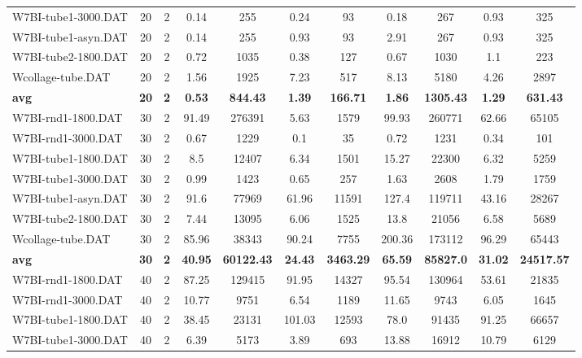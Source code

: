 \begin{table}[!ht]
\begin{tabular}{lcccccccccc}
W7BI-tube1-3000.DAT & 20 & 2 &  \textcolor{blue2}{0.14} & 255 & 0.24 & 93 & 0.18 & 267 & 0.93 & 325 \\
W7BI-tube1-asyn.DAT & 20 & 2 &  \textcolor{blue2}{0.14} & 255 & 0.93 & 93 & 2.91 & 267 & 0.93 & 325 \\
W7BI-tube2-1800.DAT & 20 & 2 & 0.72 & 1035 &  \textcolor{blue2}{0.38} & 127 & 0.67 & 1030 & 1.1 & 223 \\
Wcollage-tube.DAT & 20 & 2 &  \textcolor{blue2}{1.56} & 1925 & 7.23 & 517 & 8.13 & 5180 & 4.26 & 2897 \\
\cline{1-11} \textbf{avg} & \textbf{20} & \textbf{2} & \textbf{0.53} & \textbf{844.43} & \textbf{1.39} & \textbf{166.71} & \textbf{1.86} & \textbf{1305.43} & \textbf{1.29} & \textbf{631.43} \\ \cline{1-11}
W7BI-rnd1-1800.DAT & 30 & 2 & 91.49 & 276391 &  \textcolor{blue2}{5.63} & 1579 & 99.93 & 260771 & 62.66 & 65105 \\
W7BI-rnd1-3000.DAT & 30 & 2 & 0.67 & 1229 &  \textcolor{blue2}{0.1} & 35 & 0.72 & 1231 & 0.34 & 101 \\
W7BI-tube1-1800.DAT & 30 & 2 & 8.5 & 12407 & 6.34 & 1501 & 15.27 & 22300 &  \textcolor{blue2}{6.32} & 5259 \\
W7BI-tube1-3000.DAT & 30 & 2 & 0.99 & 1423 &  \textcolor{blue2}{0.65} & 257 & 1.63 & 2608 & 1.79 & 1759 \\
W7BI-tube1-asyn.DAT & 30 & 2 & 91.6 & 77969 & 61.96 & 11591 & 127.4 & 119711 &  \textcolor{blue2}{43.16} & 28267 \\
W7BI-tube2-1800.DAT & 30 & 2 & 7.44 & 13095 &  \textcolor{blue2}{6.06} & 1525 & 13.8 & 21056 & 6.58 & 5689 \\
Wcollage-tube.DAT & 30 & 2 &  \textcolor{blue2}{85.96} & 38343 & 90.24 & 7755 & 200.36 & 173112 & 96.29 & 65443 \\
\cline{1-11} \textbf{avg} & \textbf{30} & \textbf{2} & \textbf{40.95} & \textbf{60122.43} & \textbf{24.43} & \textbf{3463.29} & \textbf{65.59} & \textbf{85827.0} & \textbf{31.02} & \textbf{24517.57} \\ \cline{1-11}
W7BI-rnd1-1800.DAT & 40 & 2 & 87.25 & 129415 & 91.95 & 14327 & 95.54 & 130964 &  \textcolor{blue2}{53.61} & 21835 \\
W7BI-rnd1-3000.DAT & 40 & 2 & 10.77 & 9751 & 6.54 & 1189 & 11.65 & 9743 &  \textcolor{blue2}{6.05} & 1645 \\
W7BI-tube1-1800.DAT & 40 & 2 &  \textcolor{blue2}{38.45} & 23131 & 101.03 & 12593 & 78.0 & 91435 & 91.25 & 66657 \\
W7BI-tube1-3000.DAT & 40 & 2 & 6.39 & 5173 &  \textcolor{blue2}{3.89} & 693 & 13.88 & 16912 & 10.79 & 6129 \\

\end{tabular}
\end{table}
